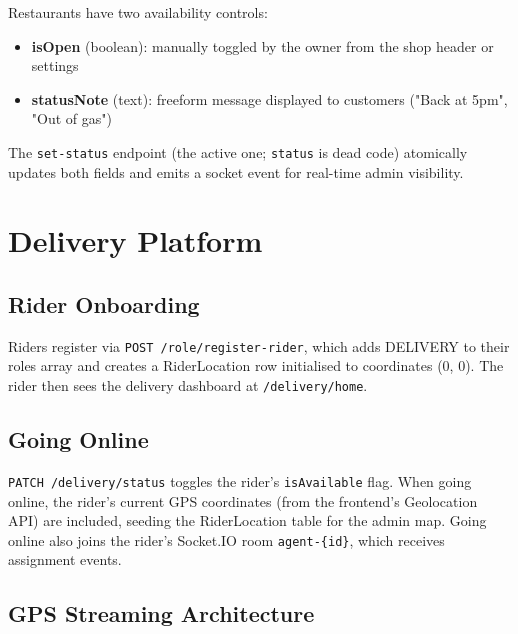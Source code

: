 \documentclass[11pt,a4paper,twoside]{book}
\begin{document}
Restaurants have two availability controls:

\begin{itemize}[leftmargin=1.4em]
  \item \textbf{isOpen} (boolean): manually toggled by the owner from the shop header or settings
  \item \textbf{statusNote} (text): freeform message displayed to customers ("Back at 5pm", "Out of gas")
\end{itemize}

The \texttt{set-status} endpoint (the active one; \texttt{status} is dead code)
atomically updates both fields and emits a socket event for real-time admin
visibility.

\chapter{Delivery Platform}

\section{Rider Onboarding}

Riders register via \texttt{POST /role/register-rider}, which adds DELIVERY to
their roles array and creates a RiderLocation row initialised to coordinates
(0, 0).  The rider then sees the delivery dashboard at \texttt{/delivery/home}.

\section{Going Online}

\texttt{PATCH /delivery/status} toggles the rider's \texttt{isAvailable} flag.
When going online, the rider's current GPS coordinates (from the frontend's
Geolocation API) are included, seeding the RiderLocation table for the admin
map.  Going online also joins the rider's Socket.IO room \texttt{agent-\{id\}},
which receives assignment events.

\section{GPS Streaming Architecture}
\end{document}
